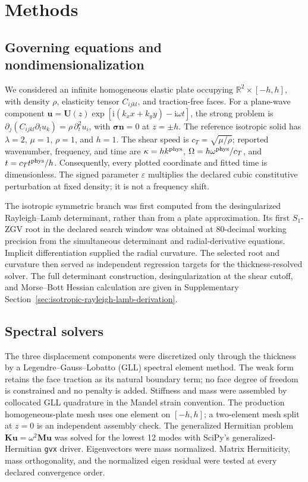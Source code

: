 \section{Methods}

\subsection{Governing equations and nondimensionalization}

We considered an infinite homogeneous elastic plate occupying
\(\mathbb R^2\times[-h,h]\), with density \(\rho\), elasticity tensor
\(C_{ijkl}\), and traction-free faces.  For a plane-wave component
\(\boldsymbol u=\boldsymbol U(z)\exp[\mathrm i(k_xx+k_yy)-\mathrm
i\omega t]\), the strong problem is
\(\partial_j(C_{ijkl}\partial_lu_k)=\rho\,\partial_t^2u_i\), with
\(\boldsymbol\sigma\boldsymbol n=0\) at \(z=\pm h\).  The reference
isotropic solid has \(\lambda=2\), \(\mu=1\), \(\rho=1\), and \(h=1\).
The shear speed is \(c_T=\sqrt{\mu/\rho}\); reported wavenumber, frequency,
and time are \(\kappa=h k^{\rm phys}\),
\(\Omega=h\omega^{\rm phys}/c_T\), and \(t=c_Tt^{\rm phys}/h\).
Consequently, every plotted coordinate and fitted time is dimensionless.
The signed parameter \(\varepsilon\) multiplies the declared cubic
constitutive perturbation at fixed density; it is not a frequency shift.

The isotropic symmetric branch was first computed from the desingularized
Rayleigh--Lamb determinant, rather than from a plate approximation.  Its first
\(S_1\)-ZGV root in the declared search window was obtained at 80-decimal
working precision from the
simultaneous determinant and radial-derivative equations.  Implicit
differentiation supplied the radial curvature.  The selected root and
curvature then served as independent regression targets for the
thickness-resolved solver.  The full determinant construction,
desingularization at the shear cutoff, and Morse--Bott Hessian calculation are
given in Supplementary Section~\ref{sec:isotropic-rayleigh-lamb-derivation}.

\subsection{Spectral solvers}

The three displacement components were discretized only through the
thickness by a Legendre--Gauss--Lobatto (GLL) spectral element method.  The
weak form retains the face traction as its natural boundary term; no face
degree of freedom is constrained and no penalty is added.  Stiffness and mass
were assembled by collocated GLL quadrature in the Mandel strain convention.
The production homogeneous-plate mesh uses one element on \([-h,h]\); a
two-element mesh split at \(z=0\) is an independent assembly check.  The
generalized Hermitian problem
\(\boldsymbol K\boldsymbol u=\omega^2\boldsymbol M\boldsymbol u\) was solved
for the lowest 12 modes with SciPy's generalized-Hermitian \texttt{gvx}
driver.  Eigenvectors were mass normalized.  Matrix Hermiticity, mass
orthogonality, and the normalized eigen residual were tested at every declared
convergence order.

